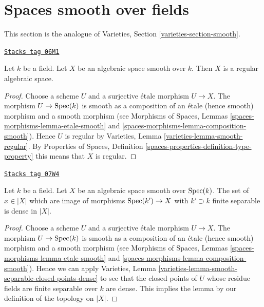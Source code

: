 \section{Spaces smooth over fields}
\label{spaces-over-fields-section-smooth}
This section is the analogue of
Varieties, Section \ref{varieties-section-smooth}.

\begin{lemma}
\label{spaces-over-fields-lemma-smooth-regular}
\href{https://stacks.math.columbia.edu/tag/06M1}{\texttt{Stacks tag 06M1}}

Let $k$ be a field.
Let $X$ be an algebraic space smooth over $k$.
Then $X$ is a regular algebraic space.
\end{lemma}

\begin{proof}
Choose a scheme $U$ and a surjective \'etale morphism $U \to X$.
The morphism $U \to \operatorname{Spec}(k)$ is smooth as a composition of
an \'etale (hence smooth) morphism and a smooth morphism (see
Morphisms of Spaces, Lemmas \ref{spaces-morphisms-lemma-etale-smooth}
and \ref{spaces-morphisms-lemma-composition-smooth}).
Hence $U$ is regular by
Varieties, Lemma \ref{varieties-lemma-smooth-regular}.
By
Properties of Spaces, Definition
\ref{spaces-properties-definition-type-property}
this means that $X$ is regular.
\end{proof}

\begin{lemma}
\label{spaces-over-fields-lemma-smooth-separable-closed-points-dense}
\href{https://stacks.math.columbia.edu/tag/07W4}{\texttt{Stacks tag 07W4}}

Let $k$ be a field. Let $X$ be an algebraic space smooth over $\operatorname{Spec}(k)$.
The set of $x \in |X|$ which are image of morphisms $\operatorname{Spec}(k') \to X$
with $k' \supset k$ finite separable is dense in $|X|$.
\end{lemma}

\begin{proof}
Choose a scheme $U$ and a surjective \'etale morphism $U \to X$.
The morphism $U \to \operatorname{Spec}(k)$ is smooth as a composition of
an \'etale (hence smooth) morphism and a smooth morphism (see
Morphisms of Spaces, Lemmas \ref{spaces-morphisms-lemma-etale-smooth}
and \ref{spaces-morphisms-lemma-composition-smooth}).
Hence we can apply Varieties, Lemma
\ref{varieties-lemma-smooth-separable-closed-points-dense} to see that
the closed points of $U$ whose residue fields are finite separable over
$k$ are dense. This implies the lemma by our definition of the
topology on $|X|$.
\end{proof}

